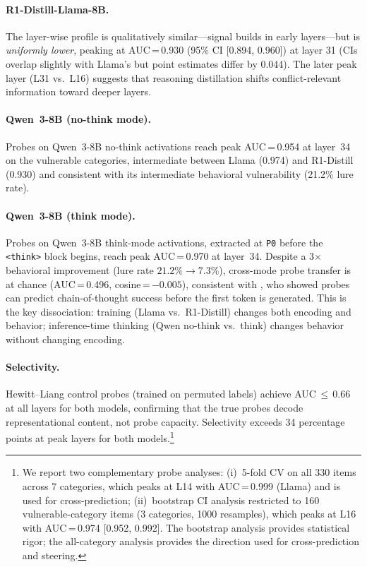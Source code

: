 \documentclass[twocolumn,10pt]{article}
\newcommand{\pzero}{\texttt{P0}}
\begin{document}
\paragraph{R1-Distill-Llama-8B.}  The layer-wise profile is qualitatively
similar---signal builds in early layers---but is \emph{uniformly lower},
peaking at AUC\,=\,0.930 (95\% CI [0.894, 0.960]) at layer 31 (CIs
overlap slightly with Llama's but point estimates differ by 0.044).
The later peak layer (L31 vs.\ L16) suggests
that reasoning distillation shifts conflict-relevant information toward
deeper layers.

\paragraph{Qwen~3-8B (no-think mode).}  Probes on Qwen~3-8B no-think
activations reach peak AUC\,=\,0.954 at layer~34 on the vulnerable
categories, intermediate between Llama (0.974) and R1-Distill (0.930)
and consistent with its intermediate behavioral vulnerability (21.2\% lure
rate).

\paragraph{Qwen~3-8B (think mode).}  Probes on Qwen~3-8B think-mode
activations, extracted at \pzero{} before the
\texttt{<think>} block begins, reach peak
AUC\,=\,0.970 at layer~34.  Despite a 3$\times$ behavioral improvement
(lure rate $21.2\% \to 7.3\%$), cross-mode probe transfer is at chance
(AUC\,=\,0.496, cosine\,=\,$-0.005$), consistent with
\citet{afzal2025knowing}, who showed probes can predict
chain-of-thought success before the first token is generated.
This is the key dissociation: training (Llama vs.\ R1-Distill)
changes both encoding and behavior; inference-time thinking (Qwen no-think
vs.\ think) changes behavior without changing encoding.

\paragraph{Selectivity.}  Hewitt--Liang control probes (trained on
permuted labels) achieve AUC\,$\leq$\,0.66 at all layers for both models,
confirming that the true probes decode representational content, not
probe capacity.  Selectivity exceeds 34 percentage points at peak layers
for both models.\footnote{We report two complementary probe analyses:
  (i)~5-fold CV on all 330 items across 7 categories, which peaks at L14
  with AUC\,=\,0.999 (Llama) and is used for cross-prediction;
  (ii)~bootstrap CI analysis restricted to 160 vulnerable-category items
  (3 categories, 1000 resamples), which peaks at L16 with
  AUC\,=\,0.974 [0.952, 0.992].  The bootstrap analysis provides
  statistical rigor; the all-category analysis provides the direction
  used for cross-prediction and steering.}
\end{document}
